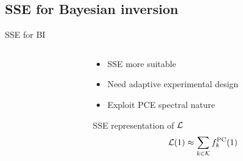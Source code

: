 \documentclass{rsuqbeamernew}
\newcommand{\BParams}{1}
\begin{document}
\subsection{SSE for Bayesian inversion}
\begin{frame}[t]{SSE for BI}
	\small
	\begin{columns}
		\begin{column}[T]{0.3\linewidth}
		\end{column}
		\begin{column}[T]{0.5\linewidth}
			\pause
			\begin{itemize}
				\item[] SSE more suitable
			\end{itemize}
			\vspace{1em}
			\pause
			\begin{itemize}
				\item[] Need adaptive experimental design
			\end{itemize}
			\vspace{1em}
			\pause
			\begin{itemize}
				\item[] Exploit PCE spectral nature
			\end{itemize}
			\pause
			\vspace{1em}
			\begin{block}{SSE representation of ${\mathcal L}$}
				\begin{equation*}
				\cl(\BParams) \approx \sum_{k\in\ck}f_k^{\mathrm{PC}}(\BParams)
				\end{equation*}
			\end{block}
		\end{column}
	\end{columns}
\end{frame}

\end{document}
